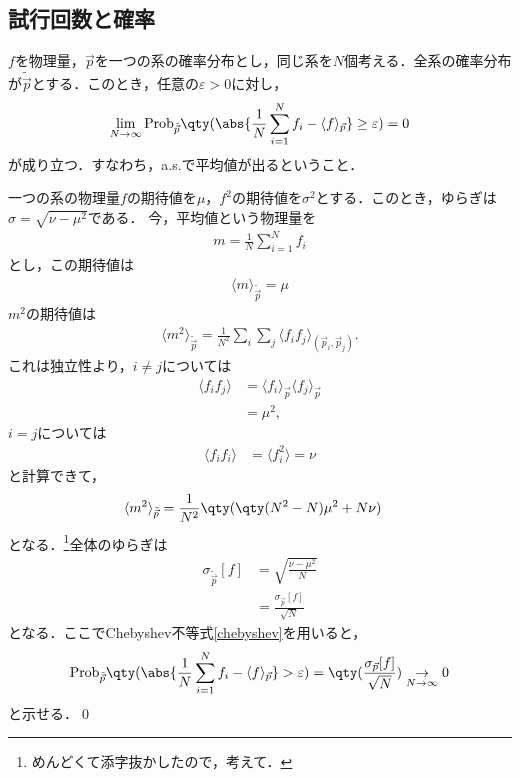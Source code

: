 \subsection{試行回数と確率}
  \begin{thm}[大数の法則]
    $f$を物理量，$\vec{p}$を一つの系の確率分布とし，同じ系を$N$個考える．全系の確率分布が$\tilde{\vec{p}}$とする．このとき，任意の$\varepsilon>0$に対し，
    \begin{align}
      \lim_{N\to\infty}\mathrm{Prob}_{\tilde{\vec{p}}}\qty(\abs{\frac{1}{N}\sum_{i=1}^{N}f_i - \langle f \rangle_{\vec{p}}}\geq \varepsilon ) = 0
    \end{align}
    が成り立つ．すなわち，a.s.で平均値が出るということ．
  \end{thm}
  \begin{pr}
    一つの系の物理量$f$の期待値を$\mu$，$f^2$の期待値を$\sigma^2$とする．このとき，ゆらぎは$\sigma = \sqrt{\nu - \mu^2}$である．
    今，平均値という物理量を
    \begin{align}
      m = \frac{1}{N} \sum_{i=1}^{N}f_i
    \end{align}
    とし，この期待値は
    \begin{align}
      \langle m \rangle_{\tilde{\vec{p}}} = \mu
    \end{align}
    $m^2$の期待値は
    \begin{align}
      \langle m^2 \rangle_{\tilde\vec{p}} = \frac{1}{N^2} \sum_{i}\sum_{j}\langle f_if_j\rangle_{(\vec{p}_i,\vec{p}_j)}.
    \end{align}
    これは独立性より，$i\neq j$については
    \begin{align}
      \langle f_if_j \rangle &= \langle f_i \rangle_{\vec{p}} \langle f_j \rangle_{\vec{p}}\\
      &= \mu^2,
    \end{align}
    $i=j$については
    \begin{align}
      \langle f_i f_i \rangle &= \langle f_i^2 \rangle = \nu
    \end{align}
    と計算できて，
    \begin{align}
      \langle m^2 \rangle _{\tilde{\vec{p}}} &= \frac{1}{N^2} \qty(\qty(N^2 - N)\mu^2 + N\nu)
    \end{align}
    となる．\footnote{めんどくて添字抜かしたので，考えて．}全体のゆらぎは
    \begin{align}
      \sigma_{\tilde{\vec{p}}}[f] &= \sqrt{\frac{\nu-\mu^2}{N}}\\
      &= \frac{\sigma_{\vec{p}}[f]}{\sqrt{N}}
    \end{align}
    となる．ここでChebyshev不等式\eqref{chebyshev}を用いると，
    \begin{align}
      \mathrm{Prob}_{\tilde{\vec{p}}}\qty(\abs{\frac{1}{N}\sum_{i=1}^{N}f_i - \langle f \rangle_{\vec{p}}} > \varepsilon) = \qty(\frac{\sigma_{\vec{p}}[f]}{\sqrt{N}}) \underset{N \to \infty}{\to} 0
    \end{align}
    と示せる．\qed
  \end{pr}
